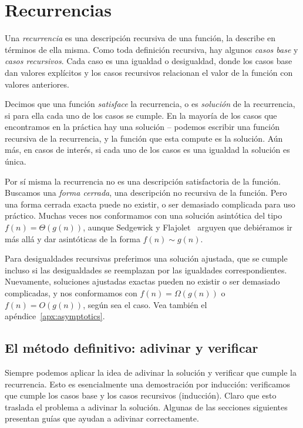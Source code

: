 

\chapter{Recurrencias}
\label{apx:recurrencias}

  Una \emph{recurrencia} es una descripción recursiva de una función,
  la describe en términos de ella misma.
  Como toda definición recursiva,
  hay algunos \emph{casos base}
  y \emph{casos recursivos}.
  Cada caso es una igualdad o desigualdad,
  donde los casos base dan valores explícitos
  y los casos recursivos
  relacionan el valor de la función con valores anteriores.

  Decimos que una función \emph{satisface} la recurrencia,
  o es \emph{solución} de la recurrencia,
  si para ella cada uno de los casos se cumple.
  En la mayoría de los casos que encontramos en la práctica
  hay una solución
  -- podemos escribir una función recursiva de la recurrencia,
  y la función que esta compute es la solución.
  Aún más,
  en casos de interés,
  si cada uno de los casos es una igualdad
  la solución es única.

  Por sí misma la recurrencia
  no es una descripción satisfactoria de la función.
  Buscamos una \emph{forma cerrada},
  una descripción no recursiva de la función.
  Pero una forma cerrada exacta puede no existir,
  o ser demasiado complicada para uso práctico.
  Muchas veces nos conformamos con una solución asintótica
  del tipo \(f(n) = \Theta(g(n))\),
  aunque Sedgewick y Flajolet~%
    \cite{sedgewick13:_introd_anal_algor}
  arguyen que debiéramos ir más allá
  y dar asintóticas de la forma \(f(n) \sim g(n)\).

  Para desigualdades recursivas preferimos una solución ajustada,
  que se cumple incluso si las desigualdades
  se reemplazan por las igualdades correspondientes.
  Nuevamente,
  soluciones ajustadas exactas pueden no existir o ser demasiado complicadas,
  y nos conformamos con \(f(n) = \Omega(g(n))\) o \(f(n) = O(g(n))\),
  según sea el caso.
  Vea también el apéndice~\ref{apx:asymptotics}.

\section{El método definitivo: adivinar y verificar}
\label{sec:adivinar-verificar}

  Siempre podemos aplicar la idea de adivinar la solución
  y verificar que cumple la recurrencia.
  Esto es esencialmente una demostración por inducción:
  verificamos que cumple los casos base
  y los casos recursivos
  (inducción).
  Claro que esto traslada el problema a adivinar la solución.
  Algunas de las secciones siguientes
  presentan guías que ayudan a adivinar correctamente.

